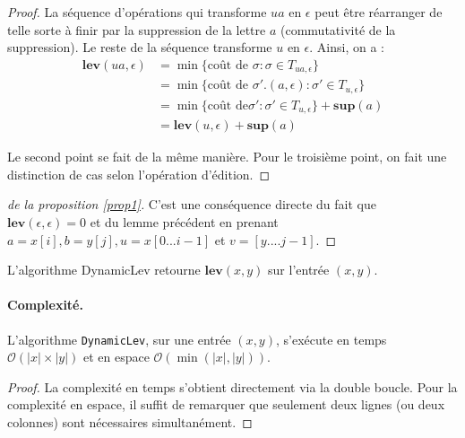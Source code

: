 \begin{proof}
La séquence d'opérations qui transforme $ua$ en $\epsilon$ peut être réarranger  de telle sorte à finir par la suppression de la lettre $a$ (commutativité de la suppression). Le reste de la séquence transforme $u$ en $\epsilon$. Ainsi, on a :
\begin{align*}
\mathbf{lev}(ua,\epsilon) &= \min\{\text{coût de } \sigma : \sigma \in T_{ua,\epsilon}\} \\
&=\min\{\text{coût de } \sigma'.(a,\epsilon) : \sigma' \in T_{u,\epsilon} \}\\
&= \min\{\text{coût de} \sigma': \sigma' \in T_{u,\epsilon} \} +\mathbf{sup}(a)\\
&= \mathbf{lev}(u,\epsilon)+\mathbf{sup}(a)
\end{align*}

Le second point se fait de la même manière. Pour le troisième point, on fait une distinction de cas selon l'opération d'édition.
\end{proof}

\begin{proof}[de la proposition \ref{prop1}]
C'est une conséquence directe du fait que $\mathbf{lev}(\epsilon,\epsilon)=0$ et du lemme précédent en prenant $a=x[i], b=y[j], u=x[0...i-1]$ et $v=[y....j-1]$.
\end{proof}

\begin{corollary}
L'algorithme DynamicLev retourne $\mathbf{lev}(x,y)$ sur l'entrée $(x,y)$.
\end{corollary}


\paragraph{Complexité.}

\begin{proposition}
L'algorithme {\tt DynamicLev}, sur une entrée $(x,y)$, s'exécute en temps $\mathcal{O}(|x| \times |y|)$ et en espace $\mathcal{O}(\min(|x|,|y|))$.
\end{proposition}

\begin{proof}
La complexité en temps s'obtient directement via la double boucle. Pour la complexité en espace, il suffit de remarquer que seulement deux lignes (ou deux colonnes) sont nécessaires simultanément.
\end{proof}
